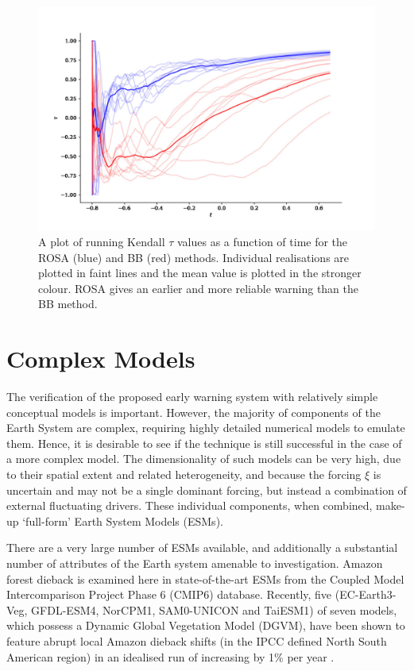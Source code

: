 \begin{figure}
\includegraphics[width=\textwidth,keepaspectratio]{figure3}
\caption[A comparison of ROSA and BB]{A plot of running Kendall $\tau$ values as a function of time for the ROSA (blue) and BB (red) methods.
  Individual realisations are plotted in faint lines and the mean value is plotted in the stronger colour. ROSA gives an earlier and more reliable warning than the BB 
method.}\label{fig:boers_method}
\end{figure}

\section{Complex Models}
The verification of the proposed early warning system with relatively simple conceptual models is important.
However, the majority of components of the Earth System are complex, requiring highly detailed numerical models to emulate them. Hence, it is 
desirable to see if the technique is still successful in the case of
a more complex model. The dimensionality of such models can be very high, due to their spatial extent and related heterogeneity, and 
because the forcing $\xi$ is uncertain and may not be a single dominant forcing,  but instead a combination of external fluctuating drivers.
These individual components, when combined, make-up `full-form' Earth System Models (ESMs).

There are a very large number of ESMs available, and additionally a substantial number of attributes of the Earth system amenable to investigation. Amazon forest dieback is
examined here in state-of-the-art ESMs from the Coupled Model Intercomparison  Project Phase 6 (CMIP6) \parencite{Eyring2016} database. Recently,
five (EC-Earth3-Veg, GFDL-ESM4, NorCPM1, SAM0-UNICON and TaiESM1) of seven models, which possess a Dynamic Global Vegetation Model
(DGVM), have been shown to feature abrupt local Amazon dieback shifts (in the IPCC defined North South American region) in an idealised run
of increasing  by 1\% per year \parencite{Parry2022}.

